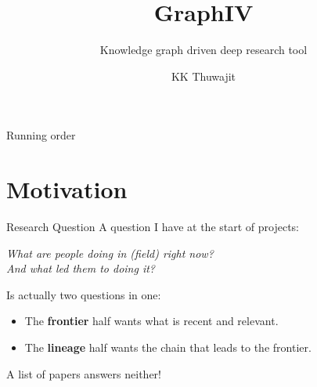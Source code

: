 \documentclass[aspectratio=169, 11pt]{beamer}
\title{GraphIV}
\subtitle{Knowledge graph driven deep research tool}
\author{KK Thuwajit}
\institute{\texttt{kuroma.dev}}
\date{}
\let\oldtextbf\textbf
\renewcommand{\textbf}[1]{{\color{ktertiary}\oldtextbf{#1}}}
\let\oldemph\emph
\renewcommand{\emph}[1]{{\color{ksecondary}\oldemph{#1}}}
\begin{document}
\begin{frame}
  \titlepage
\end{frame}

\begin{frame}{Running order}
  \tableofcontents[hideallsubsections]
\end{frame}

\section{Motivation}

\begin{frame}{Research Question}
  A question I have at the start of projects:
  \begin{kbox}{}
    \begin{center}
      \Large
      \emph{What are people doing in (field) right now?}\\[0.4em]
      \emph{And what led them to doing it?}
    \end{center}
  \end{kbox}
  \medskip
  Is actually two questions in one:
  \begin{itemize}
    \item The \textbf{frontier} half wants what is recent and relevant.
    \item The \textbf{lineage} half wants the chain that leads to the frontier.
  \end{itemize}
  \medskip
  {\small A list of papers answers neither!}
\end{frame}
\end{document}
